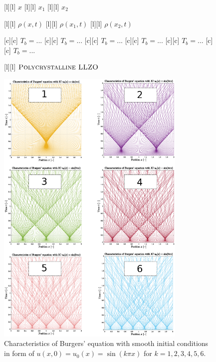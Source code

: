 \begin{figure}[ht]
	\centering
	\footnotesize

	[l] {$x$}
	[l] {$x_1$}
	[l] {$x_2$}

	[l] {$\rho(x,t)$}
	[l] {$\rho(x_{1},t)$}
	[l] {$\rho(x_{2},t)$}

	[c] {$T_{b} = ... $}
	[c] {$T_{b} = ... $}
	[c] {$T_{b} = ... $}
	[c] {$T_{b} = ... $}
	[c] {$T_{b} = ... $}
	[c] {$T_{b} = ... $}


	[l] {$\textsc{Polycrystalline LLZO}$}

	\includegraphics[width=0.81\textwidth]{characsin.eps}
	\caption{Characteristics of Burgers' equation with 
	smooth initial conditions in form of $u(x,0) = u_{0}(x) = \sin(k\pi x)$ for $k=1,2,3,4,5,6$.}
	\label{\LABEL}
\end{figure}

